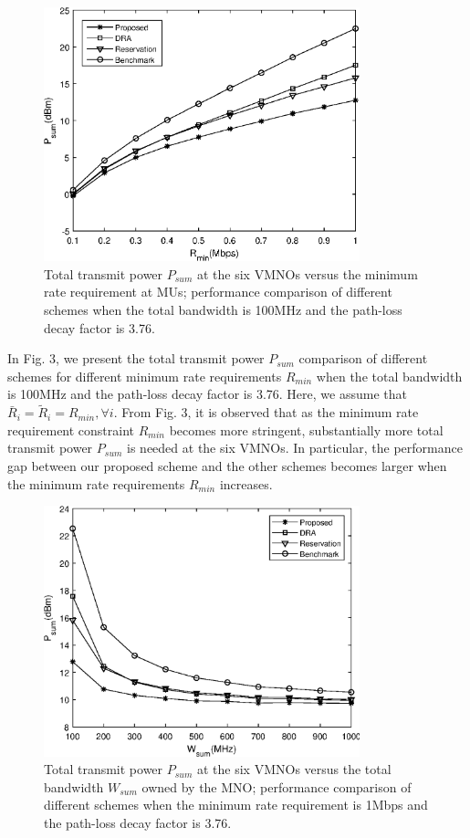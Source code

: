 \documentclass[journal]{IEEEtran}
\begin{document}
\begin{figure}
	\centering
	\includegraphics[width=3.6in]{P_rmin.eps}
	\caption{Total transmit power $P_{sum}$ at the six VMNOs versus the minimum rate requirement at MUs; performance comparison of different schemes when the total bandwidth is 100MHz and the path-loss decay factor is 3.76.}
\end{figure}

In Fig. 3, we present the total transmit power $P_{sum}$ comparison of different schemes for different minimum rate requirements $R_{min}$ when the total bandwidth is 100MHz and the path-loss decay factor is 3.76. Here, we assume that $\bar{R}_i = \tilde{R}_i= R_{min}, \forall i$. From Fig. 3, it is observed that as the minimum rate requirement constraint $R_{min}$ becomes more stringent, substantially more total transmit power $P_{sum}$ is needed at the six VMNOs. In particular, the performance gap between our proposed scheme and the other schemes becomes larger when the minimum rate requirements $R_{min}$ increases.

\begin{figure}
	\centering
	\includegraphics[width=3.6in]{P_wsum.eps}
	\caption{Total transmit power $P_{sum}$ at the six VMNOs versus the total bandwidth $W_{sum}$ owned by the MNO; performance comparison of different schemes when the minimum rate requirement is 1Mbps and the path-loss decay factor is 3.76.}
\end{figure}
\end{document}
